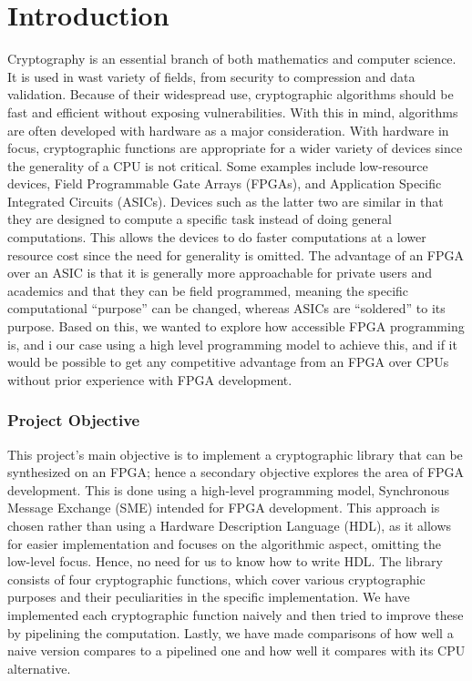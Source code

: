 \documentclass[a4paper, openany]{book}
\begin{document}
\chapter{Introduction}
\label{sec:orgaed2356}
Cryptography is an essential branch of both mathematics and computer science. It is used in wast variety of fields, from security to compression and data validation. Because of their widespread use, cryptographic algorithms should be fast and efficient without exposing vulnerabilities. With this in mind, algorithms are often developed with hardware as a major consideration. With hardware in focus, cryptographic functions are appropriate for a wider variety of devices since the generality of a CPU is not critical. Some examples include low-resource devices, Field Programmable Gate Arrays (FPGAs), and Application Specific Integrated Circuits (ASICs). Devices such as the latter two are similar in that they are designed to compute a specific task instead of doing general computations. This allows the devices to do faster computations at a lower resource cost since the need for generality is omitted. The advantage of an FPGA over an ASIC is that it is generally more approachable for private users and academics and that they can be field programmed, meaning the specific computational ``purpose'' can be changed, whereas ASICs are ``soldered'' to its purpose. Based on this, we wanted to explore how accessible FPGA programming is, and i our case using a high level programming model to achieve this, and if it would be possible to get any competitive advantage from an FPGA over CPUs without prior experience with FPGA development.

\subsection{Project Objective}
\label{sec:orgec425e4}
This project's main objective is to implement a cryptographic library that can be synthesized on an FPGA; hence a secondary objective explores the area of FPGA development. This is done using a high-level programming model, Synchronous Message Exchange (SME) intended for FPGA development. This approach is chosen rather than using a Hardware Description Language (HDL), as it allows for easier implementation and focuses on the algorithmic aspect, omitting the low-level focus. Hence, no need for us to know how to write HDL. The library consists of four cryptographic functions, which cover various cryptographic purposes and their peculiarities in the specific implementation. We have implemented each cryptographic function naively and then tried to improve these by pipelining the computation. Lastly, we have made comparisons of how well a naive version compares to a pipelined one and how well it compares with its CPU alternative.
\end{document}
